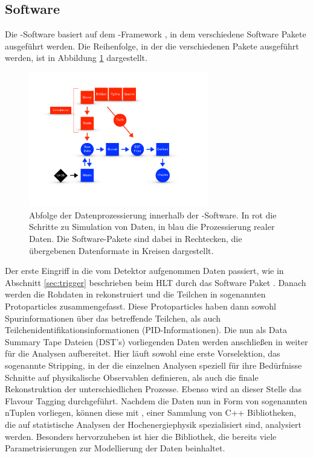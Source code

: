 \subsection{\lhcb Software}

Die \lhcb-Software basiert auf dem \gaudi-Framework \cite{gaudi}, in dem verschiedene Software Pakete ausgeführt werden. Die Reihenfolge, in der die verschiedenen Pakete ausgeführt werden, ist in Abbildung \ref{fig:software} dargestellt.
\begin{figure}[htpb]
	\centering
		\includegraphics[width=0.7\textwidth]{fig/software.pdf}
	\caption{Abfolge der Datenprozessierung innerhalb der \lhcb-Software. In rot die Schritte zu Simulation von Daten, in blau die Prozessierung realer Daten. Die Software-Pakete sind dabei in Rechtecken, die übergebenen Datenformate in Kreisen dargestellt.}
	\label{fig:software} 
\end{figure}
Der erste Eingriff in die vom Detektor aufgenommen Daten passiert, wie in Abschnitt \ref{sec:trigger} beschrieben beim HLT durch das Software Paket \moore \cite{moore}. Danach werden die Rohdaten in \brunel \cite{brunel} rekonstruiert und die Teilchen in sogenannten Protoparticles zusammengefasst. Diese Protoparticles haben dann sowohl Spurinformationen über das betreffende Teilchen, als auch Teilchenidentifikationsinformationen (PID-Informationen). Die nun als Data Summary Tape Dateien (DST's) vorliegenden Daten werden anschließen in \davinci \cite{davinci} weiter für die Analysen aufbereitet. Hier läuft sowohl eine erste Vorselektion, das sogenannte Stripping, in der die einzelnen Analysen speziell für ihre Bedürfnisse Schnitte auf physikalische Observablen definieren, als auch die finale Rekonstruktion der unterschiedlichen Prozesse. Ebenso wird an dieser Stelle das Flavour Tagging durchgeführt. Nachdem die Daten nun in Form von sogenannten nTuplen vorliegen, können diese mit \root \cite{root}, einer Sammlung von C++ Bibliotheken, die auf statistische Analysen der Hochenergiephysik spezialisiert sind, analysiert werden. Besonders hervorzuheben ist hier die \roofit \cite{roofit} Bibliothek, die bereits viele Parametrisierungen zur Modellierung der Daten beinhaltet. \\
